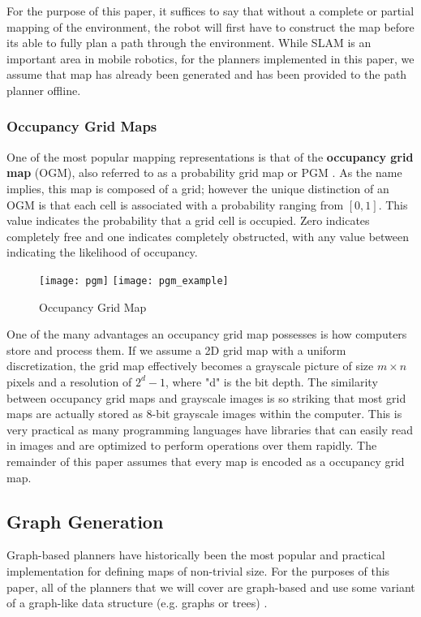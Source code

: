 For the purpose of this paper, it suffices to say that without a complete or partial mapping of the environment, the robot will first have to construct the map before its able to fully plan a path through the environment. While SLAM is an important area in mobile robotics, for the planners implemented in this paper, we assume that map has already been generated and has been provided to the path planner offline.

\subsubsection{Occupancy Grid Maps}

One of the most popular mapping representations is that of the \textbf{occupancy grid map} (OGM), also referred to as a probability grid map or PGM \cite{thrun2005probabilistic}. As the name implies, this map is composed of a grid; however the unique distinction of an OGM is that each cell is associated with a probability ranging from $[0, 1]$. This value indicates the probability that a grid cell is occupied. Zero indicates completely free and one indicates completely obstructed, with any value between indicating the likelihood of occupancy. 


\begin{figure}[h!]
  \texttt{[image: pgm]}
  \texttt{[image: pgm\_example]}
  \centering
  \label{fig:grid_map}
  \caption{Occupancy Grid Map}
\end{figure}



One of the many advantages an occupancy grid map possesses is how computers store and process them. If we assume a 2D grid map with a uniform discretization, the grid map effectively becomes a grayscale picture of size $m \times n$ pixels and a resolution of $2^d-1$, where "d" is the bit depth. The similarity between occupancy grid maps and grayscale images is so striking that most grid maps are actually stored as 8-bit grayscale images within the computer. This is very practical as many programming languages have libraries that can easily read in images and are optimized to perform operations over them rapidly. The remainder of this paper assumes that every map is encoded as a occupancy grid map. 

\subsection{Graph Generation}
Graph-based planners have historically been the most popular and practical implementation for defining maps of non-trivial size. For the purposes of this paper, all of the planners that we will cover are graph-based and use some variant of a graph-like data structure (e.g. graphs or trees) \cite{gna}.

